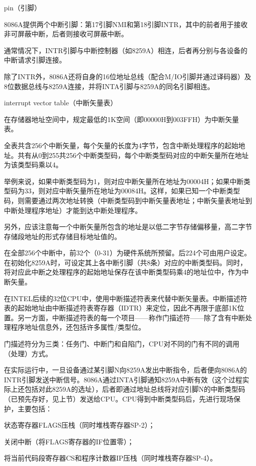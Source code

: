 \begin{compactitem}
\item pin（引脚）

8086A提供两个中断引脚：第17引脚NMI和第18引脚INTR，其中的前者用于接收非可屏蔽中断，后者则接收可屏蔽中断。

通常情况下，INTR引脚与中断控制器（如8259A）相连，后者再分别与各设备的中断请求引脚连接。

除了INTR外，8086A还将自身的16位地址总线（配合M/IO引脚并通过译码器）及8位数据总线与8259A连接，并将INTA引脚与8259A的同名引脚相连。

\item interrupt vector table（中断矢量表）

在存储器地址空间中，规定最低的1K空间（即00000H到003FFH）为中断矢量表。

全表共含256个中断矢量，每个矢量的长度为4字节，包含中断处理程序的起始地址。共有从0到255共256个中断类型码，每个中断类型码对应的中断矢量所在地址为该类型码乘以4。

举例来说，如果中断类型码为1，则对应中断矢量所在地址为00004H；如果中断类型码为33，则对应中断矢量所在地址为00084H。这样，如果已知一个中断类型码，则需要通过两次地址转换（中断类型码到中断矢量表地址；中断矢量表地址到中断处理程序地址）才能到达中断处理程序。

另外，应该注意每一个中断矢量所包含的地址是以低二字节存储偏移量，高二字节存储段地址的形式存储目标地址值的。

在全部256个中断中，前32个（0-31）为硬件系统所预留。后224个可由用户设定。在初始化8259A时，可设定其上各中断引脚（共8条）对应的中断类型码。同时，将对应此中断之处理程序的起始地址保存在该中断类型码乘4的地址位中，作为中断矢量。

在INTEL后续的32位CPU中，使用中断描述符表来代替中断矢量表。中断描述符表的起始地址由中断描述符表寄存器（IDTR）来定位，因此不再限于底部1K位置。另一方面，中断描述符表的每一个项目——称作门描述符——除了含有中断处理程序地址信息外，还包括许多属性/类型位。

门描述符分为三类：任务门、中断门和自陷门，CPU对不同的门有不同的调用（处理）方式。

\end{compactitem}

在实际运行中，一旦设备通过某引脚N向8259A发出中断指令，后者便向8086A的INTR引脚发送中断信号。8086A通过INTA引脚通知8259A中断有效（这个过程实际上还包括对此8259A的选址），后者即通过地址总线将对应引脚N的中断类型码（已预先存好，见上节）发送给CPU。CPU得到中断类型码后，先进行现场保护，主要包括：

\begin{compactenum}
\item 状态寄存器FLAGS压栈（同时堆栈寄存器SP-2）；
\item 关闭中断（将FLAGS寄存器的IF位置零）；
\item 将当前代码段寄存器CS和程序计数器IP压栈（同时堆栈寄存器SP-4）。
\end{compactenum}

